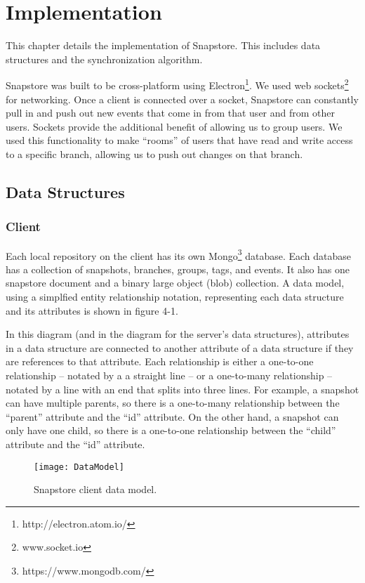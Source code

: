 \chapter{Implementation}

This chapter details the implementation of Snapstore. This includes data structures and the synchronization algorithm. 

Snapstore was built to be cross-platform using Electron\footnote{http://electron.atom.io/}. We used web sockets\footnote{www.socket.io} for networking. Once a client is connected over a socket, Snapstore can constantly pull in and push out new events that come in from that user and from other users. Sockets provide the additional benefit of allowing us to group users. We used this functionality to make ``rooms'' of users that have read and write access to a specific branch, allowing us to push out changes on that branch.

\section{Data Structures}

\subsection{Client}

Each local repository on the client has its own Mongo\footnote{https://www.mongodb.com/} database. Each database has a collection of snapshots, branches, groups, tags, and events. It also has one snapstore document and a binary large object (blob) collection. A data model, using a simplfied entity relationship notation, representing each data structure and its attributes is shown in figure 4-1. 

In this diagram (and in the diagram for the server's data structures), attributes in a data structure are connected to another attribute of a data structure if they are references to that attribute. Each relationship is either a one-to-one relationship -- notated by a a straight line -- or a one-to-many relationship -- notated by a line with an end that splits into three lines. For example, a snapshot can have multiple parents, so there is a one-to-many relationship between the ``parent'' attribute and the ``id'' attribute. On the other hand, a snapshot can only have one child, so there is a one-to-one relationship between the ``child'' attribute and the ``id'' attribute.

\begin{figure}
\texttt{[image: DataModel]}
\caption{Snapstore client data model.}
\label{arm:fig1}
\end{figure}

